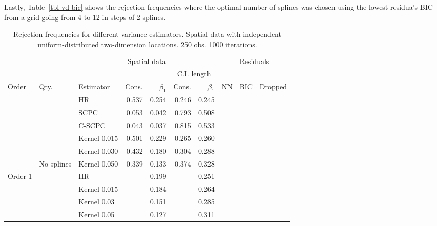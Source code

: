 \documentclass[
]{article}
\begin{document}
Lastly, Table~\ref{tbl-vd-bic} shows the rejection frequencies where the
optimal number of splines was chosen using the lowest residua's BIC from
a grid going from 4 to 12 in steps of 2 splines.
\newpage
\hypertarget{tbl-vd-grid}{}
\begin{longtable}[t]{lllrrrrrrr}
\caption{\label{tbl-vd-grid}Rejection frequencies for different variance estimators. Spatial data
with independent uniform-distributed two-dimension locations. 250 obs.
1000 iterations. }\tabularnewline

\toprule
\multicolumn{2}{c}{ } & \multicolumn{5}{c}{Spatial data} & \multicolumn{3}{c}{Residuals} \\
\cmidrule(l{3pt}r{3pt}){3-7} \cmidrule(l{3pt}r{3pt}){8-10}
\multicolumn{5}{c}{ } & \multicolumn{2}{c}{C.I. length} \\
\cmidrule(l{3pt}r{3pt}){6-7}
Order & Qty. & Estimator & Cons. & $\beta_1$ & Cons.  & $\beta_1$  & NN & BIC & Dropped\\
\midrule \endhead
 &  & HR & 0.537 & 0.254 & 0.246 & 0.245 &  &  & \\

 &  & SCPC & 0.053 & 0.042 & 0.793 & 0.508 &  &  & \\

 &  & C-SCPC & 0.043 & 0.037 & 0.815 & 0.533 &  &  & \\

 &  & Kernel 0.015 & 0.501 & 0.229 & 0.265 & 0.260 &  &  & \\

 &  & Kernel 0.030 & 0.432 & 0.180 & 0.304 & 0.288 &  &  & \\

\multirow[t]{-6}{*}{\raggedright\arraybackslash } & \multirow[t]{-6}{*}{\raggedright\arraybackslash No splines} & Kernel 0.050 & 0.339 & 0.133 & 0.374 & 0.328 & \multirow[t]{-6}{*}{\raggedleft\arraybackslash 0.630} & \multirow[t]{-6}{*}{\raggedleft\arraybackslash 711.648} & \multirow[t]{-6}{*}{\raggedleft\arraybackslash }\\
\cmidrule{1-10}
\multirow[t]{25}{*}{\raggedright\arraybackslash Order 1} &  & HR &  & 0.199 &  & 0.251 &  &  & \\

 &  & Kernel 0.015 &  & 0.184 &  & 0.264 &  &  & \\

 &  & Kernel 0.03 &  & 0.151 &  & 0.285 &  &  & \\

 &  & Kernel 0.05 &  & 0.127 &  & 0.311 &  &  & \\


\end{longtable}
\end{document}
